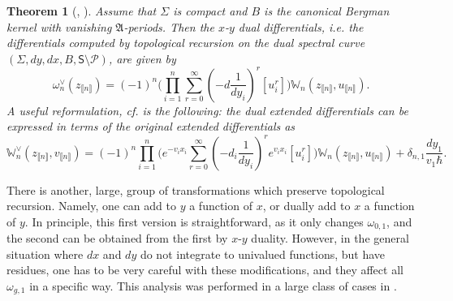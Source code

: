 \documentclass[10pt,a4paper,oneside,no-math,reqno]{amsart}%
\theoremstyle{plain}
\newtheorem{theorem}{Theorem}[section]
\theoremstyle{definition}
\theoremstyle{remark}
\numberwithin{equation}{section}
\newcommand{\mb}[1]{\mathbb{#1}}
\newcommand{\mf}[1]{\mathfrak{#1}}
\newcommand{\mc}[1]{\mathcal{#1}}
\newcommand{\1}{\mathds{1}}
\newcommand{\<}{\langle}
\renewcommand{\>}{\rangle}
\begin{document}
\begin{theorem}[{\cite[Theorem 1.14]{ABDKS25universal}, \cite[Theorem 3.6]{ABDKS25}}]\label{Thmx-y}
    Assume that $ \Sigma $ is compact and $ B $ is the canonical Bergman kernel with vanishing $ \mf{A}$-periods. Then the \emph{$ x$-$y$ dual differentials}, i.e. the differentials computed by topological recursion on the \emph{dual} spectral curve $ (\Sigma, dy, dx, B, \mathsf{S} \setminus \mc{P})$, are given by
    \begin{equation}\label{NonExtendedx-y}
        \omega^\vee_{n} (z_{\llbracket n \rrbracket})
        =
        (-1)^n \Bigg( \prod_{i=1}^n \sum_{r = 0}^\infty ( - d\frac{1}{dy_i})^r [u_i^r] \Bigg) \mb{W}_n (z_{\llbracket n \rrbracket}, u_{\llbracket n \rrbracket}).
    \end{equation}
    A useful reformulation, cf. \cite[Theorem 3.10.3]{ABDKS24} is the following: the dual extended differentials can be expressed in terms of the original extended differentials as
    \begin{equation}\label{Extendedx-y}
        \mb{W}^\vee_n (z_{\llbracket n \rrbracket}, v_{\llbracket n \rrbracket})
        =
        (-1)^n \prod_{i=1}^n \Big( e^{-v_i x_i} \sum_{r=0}^\infty (- d_i \frac{1}{dy_i} )^r e^{v_i x_i} [u_i^r] \Big) \mb{W}_n (z_{\llbracket n \rrbracket}, u_{\llbracket n \rrbracket}) + \delta_{n,1} \frac{dy_1}{v_1 \hbar}.
    \end{equation}
\end{theorem}

There is another, large, group of transformations which preserve topological recursion. Namely, one can add to $ y $ a function of $x$, or dually add to $ x$ a function of $y$. In principle, this first version is straightforward, as it only changes $ \omega_{0,1}$, and the second can be obtained from the first by $ x$-$y$ duality. However, in the general situation where $ dx$ and $ dy$ do not integrate to univalued functions, but have residues, one has to be very careful with these modifications, and they affect all $ \omega_{g,1}$ in a specific way. This analysis was performed in a large class of cases in \cite{ABDKS24}.
\end{document}

